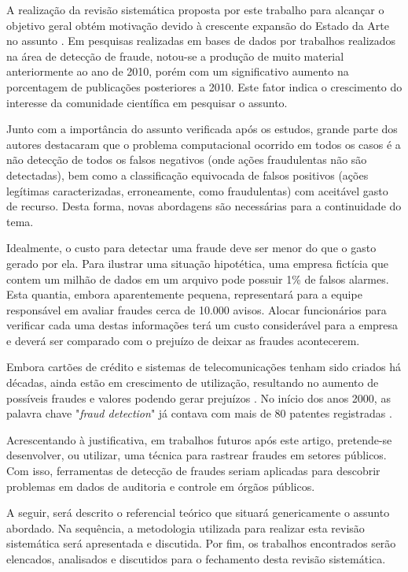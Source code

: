 \documentclass[smallextended]{svjour3}
\begin{document}
A realização da revisão sistemática proposta por este trabalho para alcançar o objetivo geral obtém motivação devido à crescente expansão do Estado da Arte no assunto \citep{Pejic-Bach2010}. Em pesquisas realizadas em bases de dados por trabalhos realizados na área de detecção de fraude, notou-se a produção de muito material anteriormente ao ano de 2010, porém com um significativo aumento na porcentagem de publicações posteriores a 2010. Este fator indica o crescimento do interesse da comunidade científica em pesquisar o assunto.

Junto com a importância do assunto verificada após os estudos, grande parte dos autores destacaram que o problema computacional ocorrido em todos os casos é a não detecção de todos os falsos negativos (onde ações fraudulentas não são detectadas), bem como a classificação equivocada de falsos positivos (ações legítimas caracterizadas, erroneamente, como fraudulentas) com aceitável gasto de recurso. Desta forma, novas abordagens são necessárias para a continuidade do tema.

Idealmente, o custo para detectar uma fraude deve ser menor do que o gasto gerado por ela. Para ilustrar uma situação hipotética, uma empresa fictícia que contem um milhão de dados em um arquivo pode possuir 1\% de falsos alarmes. Esta quantia, embora aparentemente pequena, representará para a equipe responsável em avaliar fraudes cerca de 10.000 avisos. Alocar funcionários para verificar cada uma destas informações terá um custo considerável para a empresa e deverá ser comparado com o prejuízo de deixar as fraudes acontecerem.

Embora cartões de crédito e sistemas de telecomunicações tenham sido criados há décadas, ainda estão em crescimento de utilização, resultando no aumento de possíveis fraudes e valores podendo gerar prejuízos \citep{Abdallah2016}. No início dos anos 2000, as palavra chave "\emph{fraud detection}" já contava com mais de 80 patentes registradas \citep{Bolton2002}.

Acrescentando à justificativa, em trabalhos futuros após este artigo, pretende-se desenvolver, ou utilizar, uma técnica para rastrear fraudes em setores públicos. Com isso, ferramentas de detecção de fraudes seriam aplicadas para descobrir problemas em dados de auditoria e controle em órgãos públicos.

A seguir, será descrito o referencial teórico que situará genericamente o assunto abordado. Na sequência, a metodologia utilizada para realizar esta revisão sistemática será apresentada e discutida. Por fim, os trabalhos encontrados serão elencados, analisados e discutidos para o fechamento desta revisão sistemática.
\end{document}
